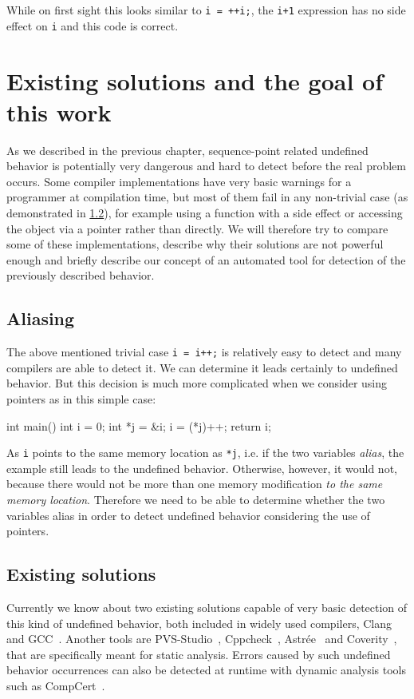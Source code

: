 While on first sight this looks similar to \verb|i = ++i;|, the \verb|i+1| expression has no side effect on \verb|i| and this code is correct.

\chapter{Existing solutions and the goal of this work}
As we described in the previous chapter, sequence-point related undefined behavior is potentially very dangerous and hard to detect before the real problem occurs. Some compiler implementations have very basic warnings for a programmer at compilation time, but most of them fail in any non-trivial case (as demonstrated in \ref{test-of-others}), for example using a function with a side effect or accessing the object via a pointer rather than directly. We will therefore try to compare some of these implementations, describe why their solutions are not powerful enough and briefly describe our concept of an automated tool for detection of the previously described behavior.
\section{Aliasing}
The above mentioned trivial case \verb|i = i++;| is relatively easy to detect and many compilers are able to detect it.
We can determine it leads certainly to undefined behavior. But this decision is much more complicated when we consider using pointers as in this simple case:
\\\begin{code}
int main(){
	int i = 0;
	int *j = &i;
	i = (*j)++;
    return i;
}
\end{code}

As \verb|i| points to the same memory location as \verb|*j|, i.e. if the two variables \emph{alias}, the example still leads to the undefined behavior. Otherwise, however, it would not, because there would not be more than one memory modification \emph{to the same memory location}. Therefore we need to be able to determine whether the two variables alias in order to detect undefined behavior considering the use of pointers.
\section{Existing solutions}\label{test-of-others}
Currently we know about two existing solutions capable of very basic detection of this kind of undefined behavior, both included in widely used compilers, Clang~\cite{Clang} and GCC~\cite{GCC}. Another tools are PVS-Studio~\cite{PVSStudio}, Cppcheck~\cite{cppcheck}, Astrée~\cite{astree} and Coverity~\cite{coverity}, that are specifically meant for static analysis. Errors caused by such undefined behavior occurrences can also be detected at runtime with dynamic analysis tools such as CompCert~\cite{CompCert}.
